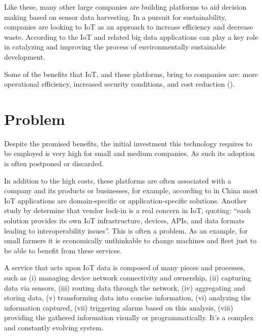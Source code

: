 Like these, many other large companies are building platforms to aid decision making based on sensor data harvesting.
In a pursuit for sustainability, companies are looking to \gls{IoT} as an approach to increase efficiency and decrease waste. According to \cite{BIBRI2018230} the \gls{IoT} and related big data applications can play a key role in catalyzing and improving the process of environmentally sustainable development.

Some of the benefits that \gls{IoT}, and these platforms, bring to companies are: more operational efficiency, increased security conditions, and cost reduction (\cite{forbes-why-iot}).

\section{Problem}
\label{sec:introduction:problem}

Despite the promised benefits, the initial investment this technology requires to be employed is very high for small and medium companies. As such its adoption is often postponed or discarded.

In addition to the high costs, these platforms are often associated with a company and its products or businesses, for example, according to \cite{6851114} in China most \gls{IoT} applications are domain-specific or application-specific solutions. Another study by \cite{noura2019interoperability} determine that vendor lock-in is a real concern in \gls{IoT}, quoting: ``each solution provides its own IoT infrastructure, devices, APIs, and data formats leading to interoperability issues''.
This is often a problem. As an example, for small farmers it is economically unthinkable to change machines and fleet just to be able to benefit from these services.

A service that acts upon \gls{IoT} data is composed of many pieces and processes, such as (i) managing device network connectivity and ownership, (ii) capturing data via sensors, (iii) routing data through the network, (iv) aggregating and storing data, (v) transforming data into concise information, (vi)  analyzing the information captured, (vii) triggering alarms based on this analysis, (viii) providing the gathered information visually or programmatically. It's a complex and constantly evolving system.

